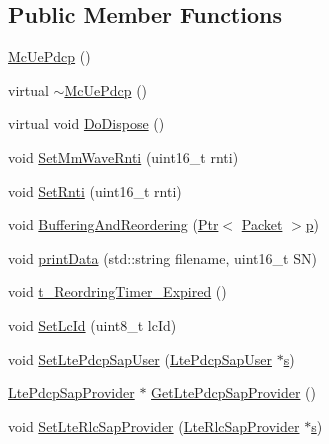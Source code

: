 \subsection*{Public Member Functions}
\begin{DoxyCompactItemize}
\item 
\hyperlink{classns3_1_1McUePdcp_ac6e951fc0d0dcf2fcc88164f8e0044c4}{Mc\+Ue\+Pdcp} ()
\item 
virtual \hyperlink{classns3_1_1McUePdcp_aed4175882f4476e74e00d87d1e865732}{$\sim$\+Mc\+Ue\+Pdcp} ()
\item 
virtual void \hyperlink{classns3_1_1McUePdcp_a10c8627b0916fd663a7b81f5114c4591}{Do\+Dispose} ()
\item 
void \hyperlink{classns3_1_1McUePdcp_a1a464393107fc57b060a6fc120208152}{Set\+Mm\+Wave\+Rnti} (uint16\+\_\+t rnti)
\item 
void \hyperlink{classns3_1_1McUePdcp_a1d597252cb902334c3c1d11907df0254}{Set\+Rnti} (uint16\+\_\+t rnti)
\item 
void \hyperlink{classns3_1_1McUePdcp_af427000ceed62252a0cce301d47f2e68}{Buffering\+And\+Reordering} (\hyperlink{classns3_1_1Ptr}{Ptr}$<$ \hyperlink{classns3_1_1Packet}{Packet} $>$\hyperlink{lte__link__budget__x2__handover__measures_8m_ac9de518908a968428863f829398a4e62}{p})
\item 
void \hyperlink{classns3_1_1McUePdcp_af1620090ce7552e184098488475d5ff4}{print\+Data} (std\+::string filename, uint16\+\_\+t SN)
\item 
void \hyperlink{classns3_1_1McUePdcp_a9a65382b4dba3e92f958eda6030cedeb}{t\+\_\+\+Reordring\+Timer\+\_\+\+Expired} ()
\item 
void \hyperlink{classns3_1_1McUePdcp_af8cfab0821b897e20865dc3e4a98f0c6}{Set\+Lc\+Id} (uint8\+\_\+t lc\+Id)
\item 
void \hyperlink{classns3_1_1McUePdcp_a5a18f8ac631b3251cfe60d3867ea84b4}{Set\+Lte\+Pdcp\+Sap\+User} (\hyperlink{classns3_1_1LtePdcpSapUser}{Lte\+Pdcp\+Sap\+User} $\ast$\hyperlink{generate__test__data__lte__sinr_8m_ad83eeb3a142285d1243a08c6b7026df8}{s})
\item 
\hyperlink{classns3_1_1LtePdcpSapProvider}{Lte\+Pdcp\+Sap\+Provider} $\ast$ \hyperlink{classns3_1_1McUePdcp_ab51345427bff31eae2ba4238fe52c687}{Get\+Lte\+Pdcp\+Sap\+Provider} ()
\item 
void \hyperlink{classns3_1_1McUePdcp_a6526707dacd489b82deffa9aecde8e8f}{Set\+Lte\+Rlc\+Sap\+Provider} (\hyperlink{classns3_1_1LteRlcSapProvider}{Lte\+Rlc\+Sap\+Provider} $\ast$\hyperlink{generate__test__data__lte__sinr_8m_ad83eeb3a142285d1243a08c6b7026df8}{s})

\end{DoxyCompactItemize}
